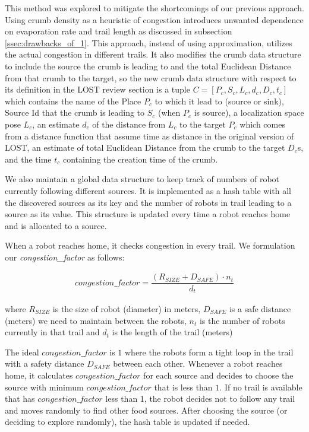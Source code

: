 \documentclass[letterpaper, 10 pt, conference]{ieeeconf}  %
\begin{document}
This method was explored to mitigate the shortcomings of our previous approach. Using crumb density as a heuristic of congestion introduces unwanted dependence on evaporation rate and trail length as discussed in subsection \ref{ssec:drawbacks_of_1}. This approach, instead of using approximation, utilizes the actual congestion in different trails. It also modifies the crumb data structure to include the source the crumb is leading to and the total Euclidean Distance from that crumb to the target, so the new crumb data structure with respect to its definition in the LOST review section is a tuple $C = [P_c, S_c, L_c, d_c, D_c, t_c]$ which contains the name of the Place $P_c$ to which it lead to (source or sink), Source Id that the crumb is leading to $S_c$ (when $P_c$ is source), a localization space pose $L_c$, an estimate $d_c$ of the distance from $L_c$ to the target $P_c$ which comes from a distance function that assume time as distance in the original version of LOST, an estimate of total Euclidean Distance from the crumb to the target $D_c$s, and the time $t_c$ containing the creation time of the crumb.

We also maintain a global data structure to keep track of numbers of robot currently following different sources. It is implemented as a hash table with all the discovered sources as its key and the number of robots in trail leading to a source as its value. This structure is updated every time a robot reaches home and is allocated to a source.

When a robot reaches home, it checks congestion in every trail. We formulation our \emph{congestion\_factor} as follows:

\begin{equation}
\begin{split}
  congestion\_factor = \dfrac{(R_{SIZE} + D_{SAFE}) \cdot n_t}{ d_t }
\end{split}
\end{equation}

where $R_{SIZE}$ is the size of robot (diameter) in meters, $D_{SAFE}$ is a safe distance (meters) we need to maintain between the robots, $n_t$ is the number of robots currently in that trail and $d_t$ is the length of the trail (meters)

The ideal $congestion\_factor$ is $1$ where the robots form a tight loop in the trail with a safety distance  $D_{SAFE}$ between each other. Whenever a robot reaches home, it calculates $congestion\_factor$ for each source and decides to choose the source with minimum $congestion\_factor$ that is less than $1$. If no trail is available that has $congestion\_factor$ less than 1, the robot decides not to follow any trail and moves randomly to find other food sources. After choosing the source (or deciding to explore randomly), the hash table is updated if needed.
\end{document}
